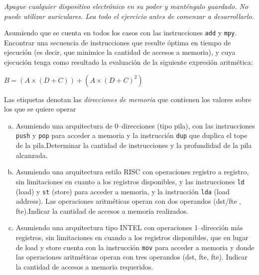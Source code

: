 \documentclass[12pt,a4paper]{article}
\begin{document}

\begin{centering}
\textit{Apague cualquier dispositivo electrónico en su poder y manténgalo guardado. No puede utilizar auriculares. Lea todo el ejercicio antes de comenzar a desarrollarlo.}
\end{centering}

Asumiendo que se cuenta en todos los casos con las instrucciones \texttt{add} y \texttt{mpy}. Encontrar una secuencia de instrucciones que resulte óptima en tiempo de ejecución (es decir, que minimice la cantidad de accesos a memoria), y cuya ejecución tenga como resultado la evaluación de la siguiente expresión aritmética:

\begin{center}
	$B = (A \times (D + C))  + (A \times (D + C)^2)$
\end{center}
Las etiquetas denotan las \textit{direcciones de memoria} que contienen los valores sobre los que se quiere operar

\begin{enumerate}[a)]
	
	\item Asumiendo una arquitectura de 0--direcciones (tipo pila), con las instrucciones \texttt{push} y \texttt{pop} para acceder a memoria y la instrucción \texttt{dup} que duplica el tope de la pila.Determinar la cantidad de instrucciones y la profundidad de la pila alcanzada. 
	
	\item Asumiendo una arquitectura estilo RISC con operaciones registro a registro, sin limitaciones en cuanto a los registros disponibles, y las instrucciones \texttt{ld} (load) y \texttt{st} (store) para acceder a memoria, y la instrucción \texttt{lda} (load address). Las operaciones aritméticas operan con dos operandos (dst/fte , fte).Indicar la cantidad de accesos a memoria realizados.
	
	\item Asumiendo una arquitectura tipo INTEL con operaciones 1--dirección más registros, sin limitaciones en cuando a los registros disponibles, que en lugar de load y store cuenta con la instrucción \texttt{mov} para acceder a memoria y donde las operaciones aritméticas operan con tres operandos (dst, fte, fte). Indicar la cantidad de accesos a memoria requeridos.

	
	
\end{enumerate}
\end{document}
